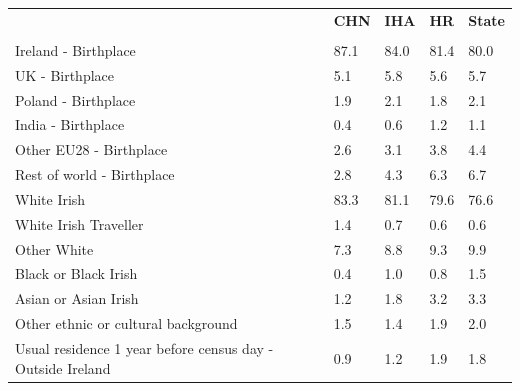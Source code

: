 \documentclass{article}
\begin{document}
\pagebreak
\begin{table}[h]	
\centering
		\begin{tabular}{KTTTT}
  \hline
& \textbf{CHN} & \textbf{IHA} & \textbf{HR}& \textbf{State}\\ 
  \hline
    \\ 
    \hline
Ireland - Birthplace & 87.1& 84.0& 81.4& 80.0\\
UK - Birthplace & 5.1& 5.8& 5.6& 5.7\\
Poland - Birthplace & 1.9& 2.1& 1.8& 2.1\\
India - Birthplace & 0.4& 0.6& 1.2& 1.1\\
Other EU28 - Birthplace & 2.6& 3.1& 3.8& 4.4\\
Rest of world - Birthplace & 2.8& 4.3& 6.3& 6.7\\
    \hline
White Irish & 83.3& 81.1& 79.6& 76.6\\
White Irish Traveller & 1.4& 0.7& 0.6& 0.6\\
Other White & 7.3& 8.8& 9.3& 9.9\\
Black or Black Irish & 0.4& 1.0& 0.8& 1.5\\
Asian or Asian Irish & 1.2& 1.8& 3.2& 3.3\\
Other ethnic or cultural background & 1.5& 1.4& 1.9& 2.0\\
    \hline
Usual residence 1 year before census day - Outside Ireland & 0.9& 1.2& 1.9& 1.8\\


\end{tabular}
\end{table}
\end{document}
